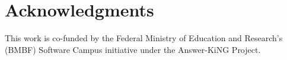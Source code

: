 \documentclass[sigconf, superscriptaddress]{acmart}
\begin{document}
\section{Acknowledgments}
This work is co-funded by the Federal Ministry of Education and Research's (BMBF) Software Campus initiative under the Answer-KiNG Project.









\end{document}

